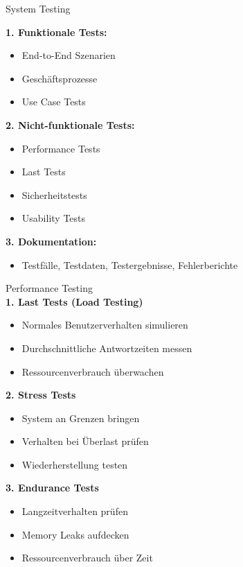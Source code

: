 \begin{KR}{System Testing}

\begin{minipage}[t]{0.5\textwidth}
\textbf{1. Funktionale Tests:}
\begin{itemize}
   \item End-to-End Szenarien
   \item Geschäftsprozesse
   \item Use Case Tests
\end{itemize}
\end{minipage}
\begin{minipage}[t]{0.5\textwidth}
\textbf{2. Nicht-funktionale Tests:}
\begin{itemize}
   \item Performance Tests
   \item Last Tests
   \item Sicherheitstests
   \item Usability Tests
\end{itemize}
\end{minipage}

\textbf{3. Dokumentation:}
\begin{itemize}
   \item Testfälle, Testdaten, Testergebnisse, Fehlerberichte
\end{itemize}
\end{KR}


\begin{KR}{Performance Testing}\\
\textbf{1. Last Tests (Load Testing)}
\begin{itemize}
   \item Normales Benutzerverhalten simulieren
   \item Durchschnittliche Antwortzeiten messen
   \item Ressourcenverbrauch überwachen
\end{itemize}

\textbf{2. Stress Tests}
\begin{itemize}
   \item System an Grenzen bringen
   \item Verhalten bei Überlast prüfen
   \item Wiederherstellung testen
\end{itemize}

\textbf{3. Endurance Tests}
\begin{itemize}
   \item Langzeitverhalten prüfen
   \item Memory Leaks aufdecken
   \item Ressourcenverbrauch über Zeit
\end{itemize}
\end{KR}





